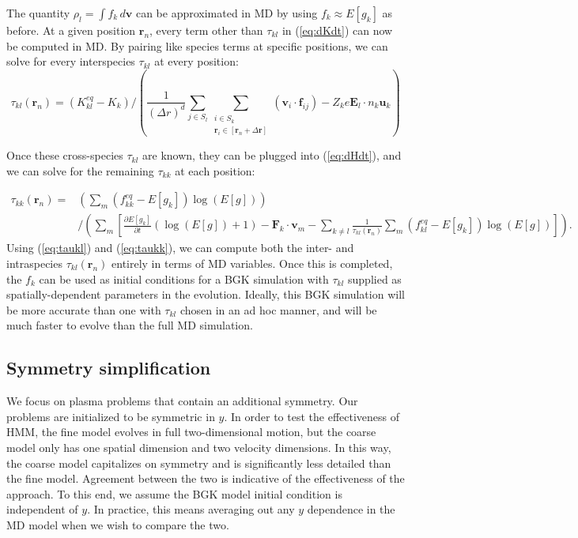 \documentclass{article}
\begin{document}
The quantity $\rho_l=\int f_k\,d\mathbf{v}$ can be approximated in MD by using $f_k\approx E[g_k]$ as before. At a given position $\mathbf{r}_n$, every term other than $\tau_{kl}$ in (\ref{eq:dKdt}) can now be computed in MD. By pairing like species terms at specific positions, we can solve for every interspecies $\tau_{kl}$ at every position:
\begin{equation}
 \tau_{kl}(\mathbf{r}_n)=\left(K_{kl}^{eq}-K_k\right)\bigg/\left(\frac{1}{(\Delta r)^d}\sum_{j\in S_l}\sum_{\substack{i\in S_k\\\mathbf{r}_i\in [\mathbf{r}_n+\Delta \mathbf{r}]}}(\mathbf{v}_i\cdot \mathbf{f}_{ij})-Z_k e \mathbf{E}_l\cdot n_k\mathbf{u}_k\right)\label{eq:taukl}
\end{equation}

Once these cross-species $\tau_{kl}$ are known, they can be plugged into (\ref{eq:dHdt}), and we can solve for the remaining $\tau_{kk}$ at each position:

\begin{equation}
\begin{split}
 \tau_{kk}(\mathbf{r}_n)=&\left(\sum_m (f_{kk}^{eq}-E[g_k])\log(E[g])\right)\\&\bigg/\left(\sum_m\left[\frac{\partial E[g_k]}{\partial t}(\log(E[g])+1)-\mathbf{F}_k\cdot \mathbf{v}_m-\sum_{k\neq l}\frac{1}{\tau_{kl}(\mathbf{r}_n)}\sum_m(f_{kl}^{eq}-E[g_k])\log(E[g])\right]\right).
\end{split}\label{eq:taukk}
\end{equation}Using (\ref{eq:taukl}) and (\ref{eq:taukk}), we can compute both the inter- and intraspecies $\tau_{kl}(\mathbf{r}_n)$ entirely in terms of MD variables. Once this is completed, the $f_k$ can be used as initial conditions for a BGK simulation with $\tau_{kl}$ supplied as spatially-dependent parameters in the evolution. Ideally, this BGK simulation will be more accurate than one with $\tau_{kl}$ chosen in an ad hoc manner, and will be much faster to evolve than the full MD simulation. 


\subsection{Symmetry simplification}

We focus on plasma problems that contain an additional symmetry. Our problems are initialized to be symmetric in $y$. In order to test the effectiveness of HMM, the fine model evolves in full two-dimensional motion, but the coarse model only has one spatial dimension and two velocity dimensions. In this way, the coarse model capitalizes on symmetry and is significantly less detailed than the fine model. Agreement between the two is indicative of the effectiveness of the approach. To this end, we assume the BGK model initial condition is independent of $y$. In practice, this means averaging out any $y$ dependence in the MD model when we wish to compare the two.
\end{document}
